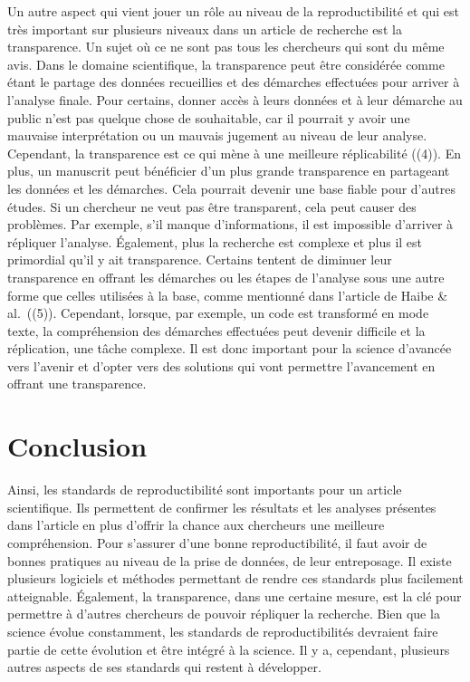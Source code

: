 \documentclass[9pt,twocolumn,twoside,]{pnas-new}
\begin{document}
Un autre aspect qui vient jouer un rôle au niveau de la reproductibilité
et qui est très important sur plusieurs niveaux dans un article de
recherche est la transparence. Un sujet où ce ne sont pas tous les
chercheurs qui sont du même avis. Dans le domaine scientifique, la
transparence peut être considérée comme étant le partage des données
recueillies et des démarches effectuées pour arriver à l'analyse finale.
Pour certains, donner accès à leurs données et à leur démarche au public
n'est pas quelque chose de souhaitable, car il pourrait y avoir une
mauvaise interprétation ou un mauvais jugement au niveau de leur
analyse. Cependant, la transparence est ce qui mène à une meilleure
réplicabilité ((4)). En plus, un manuscrit peut bénéficier d'un plus
grande transparence en partageant les données et les démarches. Cela
pourrait devenir une base fiable pour d'autres études. Si un chercheur
ne veut pas être transparent, cela peut causer des problèmes. Par
exemple, s'il manque d'informations, il est impossible d'arriver à
répliquer l'analyse. Également, plus la recherche est complexe et plus
il est primordial qu'il y ait transparence. Certains tentent de diminuer
leur transparence en offrant les démarches ou les étapes de l'analyse
sous une autre forme que celles utilisées à la base, comme mentionné
dans l'article de Haibe \& al.~((5)). Cependant, lorsque, par exemple,
un code est transformé en mode texte, la compréhension des démarches
effectuées peut devenir difficile et la réplication, une tâche complexe.
Il est donc important pour la science d'avancée vers l'avenir et d'opter
vers des solutions qui vont permettre l'avancement en offrant une
transparence.

\hypertarget{conclusion}{%
\section{Conclusion}\label{conclusion}}

Ainsi, les standards de reproductibilité sont importants pour un article
scientifique. Ils permettent de confirmer les résultats et les analyses
présentes dans l'article en plus d'offrir la chance aux chercheurs une
meilleure compréhension. Pour s'assurer d'une bonne reproductibilité, il
faut avoir de bonnes pratiques au niveau de la prise de données, de leur
entreposage. Il existe plusieurs logiciels et méthodes permettant de
rendre ces standards plus facilement atteignable. Également, la
transparence, dans une certaine mesure, est la clé pour permettre à
d'autres chercheurs de pouvoir répliquer la recherche. Bien que la
science évolue constamment, les standards de reproductibilités devraient
faire partie de cette évolution et être intégré à la science. Il y a,
cependant, plusieurs autres aspects de ses standards qui restent à
développer.
\end{document}
